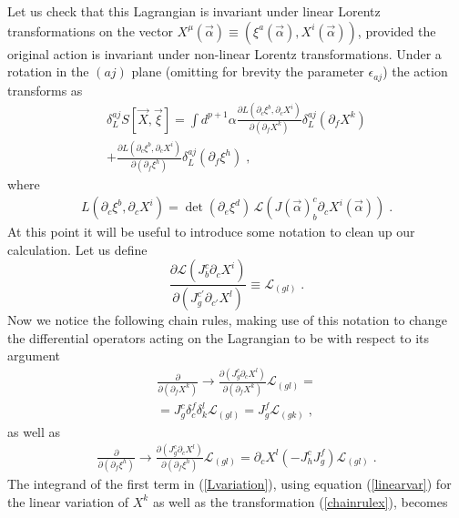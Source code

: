 \documentclass[%
 reprint,
 amsmath,amssymb,
 aps,
]{revtex4-1}
\begin{document}
Let us check that this Lagrangian is invariant under linear Lorentz
transformations on the vector $X^{\mu}(\vec{\alpha}) \equiv (\xi^a(\vec{\alpha}), X^i(\vec{\alpha}))$,
provided the original  action is invariant under non-linear Lorentz transformations. Under  a rotation
in the $(aj)$ plane (omitting for brevity the parameter $\epsilon_{a j}$) the action transforms as
\begin{gather}
\label{Lvariation}
    \delta^{a j}_{L}S[\vec{X},\vec{\xi}] =
    \int d^{p+1} \alpha \frac{\partial L(\partial_c \xi^b, \partial_c X^i)}{\partial(\partial_f X^k)}
    \delta^{a j}_{L} (\partial_f X^k)  \\
    + \frac{\partial L(\partial_c \xi^b, \partial_c X^i)}{\partial(\partial_f \xi^h)}
    \delta^{a j}_{L} (\partial_f \xi^h) \nonumber\;,
\end{gather}
where
\begin{eqnarray}
    L(\partial_c \xi^b, \partial_c X^i) = \mathrm{\det}( \partial_e \xi^d )
    \, \mathcal{L}( J(\vec{\alpha})^c_b \partial_c X^i(\vec{\alpha}) )\;.  \nonumber
\end{eqnarray}
At this point it will be useful to introduce some notation to clean up our calculation.  Let us define
\begin{equation}
    \frac{\partial \mathcal{L}(J^c_b \partial_c X^i)}{\partial (J^{c'}_g \partial_{c'} X^l)} \equiv \mathcal{L}_{(g l)} \; . \nonumber
\end{equation}
Now we notice the following chain rules, making use of this notation to change the differential operators acting
on the Lagrangian to be with respect to its argument
\begin{gather}
    \frac{\partial}{\partial(\partial_f X^k)} \rightarrow
    \frac{\partial(J^c_g \partial_c X^l)}{\partial (\partial_f X^k)}
    \mathcal{L}_{(g l)} = \nonumber \\
    = J^c_g \delta^f_c \delta^l_k \mathcal{L}_{(g l)}= J^f_g \mathcal{L}_{(g k)} \; ,
    \label{chainrulex}
\end{gather}
as well as
\begin{gather}
\label{chainrulexi}
    \frac{\partial}{\partial (\partial_f \xi^h)} \rightarrow
    \frac{\partial (J^c_g \partial_c X^l)}{\partial (\partial_f \xi^h)} \mathcal{L}_{(g l)}
    = \partial_c X^l (-J^c_h J^f_g)  \mathcal{L}_{(g l)} \; .
\end{gather}
The integrand of the first term in (\ref{Lvariation}), using equation (\ref{linearvar}) for
the linear variation of $X^k$ as well as the transformation (\ref{chainrulex}), becomes
\end{document}
